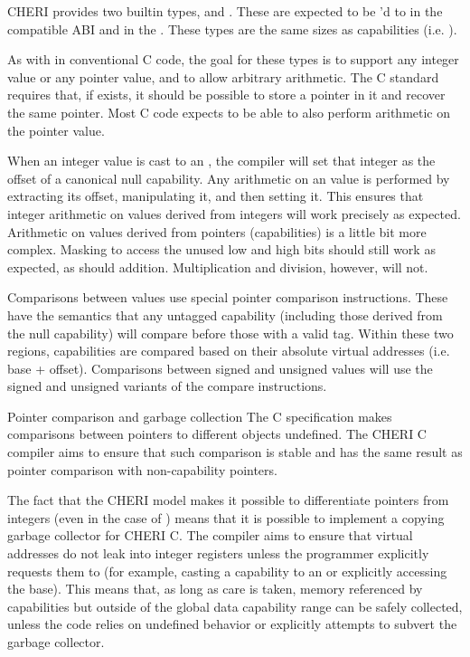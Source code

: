 CHERI provides two builtin types,  and .  These are expected to be 'd to  in the compatible ABI and  in the \sandboxABI.  These types are the same sizes as capabilities (i.e. ).  

As with  in conventional C code, the goal for these types is to support any integer value or any pointer value, and to allow arbitrary arithmetic.  The C standard requires that, if  exists, it should be possible to store a pointer in it and recover the same pointer.  Most C code expects to be able to also perform arithmetic on the pointer value.

When an integer value is cast to an , the compiler will set that integer as the offset of a canonical null capability.  Any arithmetic on an  value is performed by extracting its offset, manipulating it, and then setting it.  This ensures that integer arithmetic on  values derived from integers will work precisely as expected.  Arithmetic on values derived from pointers (capabilities) is a little bit more complex.  Masking to access the unused low and high bits should still work as expected, as should addition.  Multiplication and division, however, will not.

Comparisons between  values use special pointer comparison instructions.
These have the semantics that any untagged capability (including those derived from the null capability) will compare before those with a valid tag.
Within these two regions, capabilities are compared based on their absolute virtual addresses (i.e. base + offset).
Comparisons between signed and unsigned  values will use the signed and unsigned variants of the compare instructions.

\begin{notebox}{Pointer comparison and garbage collection}
The C specification makes comparisons between pointers to different objects undefined.
The CHERI C compiler aims to ensure that such comparison is stable and has the same result as pointer comparison with non-capability pointers.

The fact that the CHERI model makes it possible to differentiate pointers from integers (even in the case of ) means that it is possible to implement a copying garbage collector for CHERI C.
The compiler aims to ensure that virtual addresses do not leak into integer registers unless the programmer explicitly requests them to (for example, casting a capability to an  or explicitly accessing the base).
This means that, as long as care is taken, memory referenced by capabilities but outside of the global data capability range can be safely collected, unless the code relies on undefined behavior or explicitly attempts to subvert the garbage collector.
\end{notebox}

